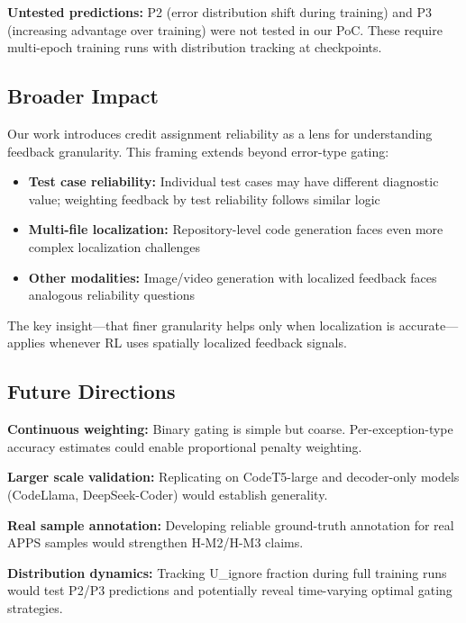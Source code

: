 \textbf{Untested predictions:} P2 (error distribution shift during training) and P3 (increasing advantage over training) were not tested in our PoC. These require multi-epoch training runs with distribution tracking at checkpoints.

\subsection{Broader Impact}

Our work introduces credit assignment reliability as a lens for understanding feedback granularity. This framing extends beyond error-type gating:

\begin{itemize}
\item \textbf{Test case reliability:} Individual test cases may have different diagnostic value; weighting feedback by test reliability follows similar logic
\item \textbf{Multi-file localization:} Repository-level code generation faces even more complex localization challenges
\item \textbf{Other modalities:} Image/video generation with localized feedback faces analogous reliability questions
\end{itemize}

The key insight---that finer granularity helps only when localization is accurate---applies whenever RL uses spatially localized feedback signals.

\subsection{Future Directions}

\textbf{Continuous weighting:} Binary gating is simple but coarse. Per-exception-type accuracy estimates could enable proportional penalty weighting.

\textbf{Larger scale validation:} Replicating on CodeT5-large and decoder-only models (CodeLlama, DeepSeek-Coder) would establish generality.

\textbf{Real sample annotation:} Developing reliable ground-truth annotation for real APPS samples would strengthen H-M2/H-M3 claims.

\textbf{Distribution dynamics:} Tracking U\_ignore fraction during full training runs would test P2/P3 predictions and potentially reveal time-varying optimal gating strategies.
